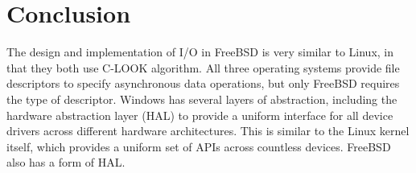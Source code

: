 \documentclass[letterpaper,draftclsnofoot,10pt,onecolumn,titlepage]{IEEEtran}\usepackage[margin=0.75in]{geometry}
\begin{document}
\section{Conclusion}
The design and implementation of I/O in FreeBSD is very similar to Linux, in that they both use C-LOOK algorithm.
All three operating systems provide file descriptors to specify asynchronous data operations, but only FreeBSD
requires the type of descriptor. Windows has several layers of abstraction, including the hardware 
abstraction layer (HAL) to provide a uniform interface for all device drivers across different hardware 
architectures. This is similar to the Linux kernel itself, which provides a uniform set of APIs across 
countless devices. FreeBSD also has a form of HAL.



\end{document}
